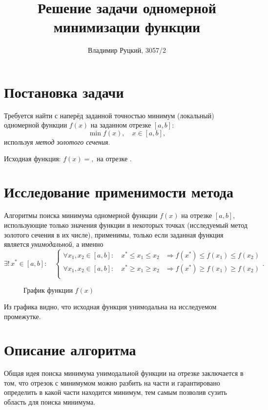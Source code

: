 \documentclass[10pt,a4paper,titlepage]{article}
\title{Решение задачи одномерной минимизации функции}
\author{Владимир Руцкий, 3057/2}
\date{}
\begin{document}
\maketitle
\thispagestyle{empty}

\section{Постановка задачи}
Требуется найти с наперёд заданной точностью минимум (локальный) одномерной функции $f(x)$ на заданном отрезке $[a, b]$:
$$ \min f(x), \quad x \in [a, b], $$
используя \textit{метод золотого сечения}.

Исходная функция: $f(x) = ,$ на отрезке $.$

\section{Исследование применимости метода}
Алгоритмы поиска минимума одномерной функции $f(x)$ на отрезке $[a, b]$, 
использующие только значения функции в некоторых точках 
(исследуемый метод золотого сечения в их числе), применимы, только
если заданная функция является \textit{унимодальной}, а именно
$$ \exists ! \, x^* \in [a, b]: \quad
\begin{cases}
  \forall x_1, x_2 \in [a,b]: \quad x^* \leqslant x_1 \leqslant x_2 & \Rightarrow f(x^*) \leqslant f(x_1) \leqslant f(x_2) \\
  \forall x_1, x_2 \in [a,b]: \quad x^* \geqslant x_1 \geqslant x_2 & \Rightarrow f(x^*) \geqslant f(x_1) \geqslant f(x_2) \\
\end{cases}.
$$

\begin{figure}[h]
  \label{function-graph}
  \caption{График функции $f(x)$}
  \begin{center}
  
  \end{center}
\end{figure}


Из графика видно, что исходная функция унимодальна на исследуемом промежутке.

\section{Описание алгоритма}
Общая идея поиска минимума унимодальной функции на отрезке заключается в том, 
что отрезок с минимумом можно разбить на части и гарантировано определить в какой части находится минимум,
тем самым позволив сузить область для поиска минимума.
\end{document}
